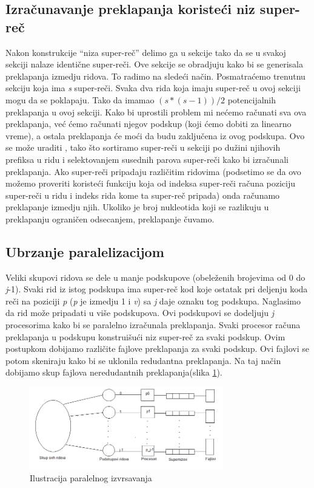 \documentclass[a4paper]{article}
\begin{document}
{\subsection{Izračunavanje preklapanja koristeći niz super-reč}
\label{subsec:ipknsr}
\indent Nakon konstrukcije ``niza super-reč'' delimo ga u sekcije tako da se u svakoj sekciji nalaze identične super-reči. Ove sekcije se obradjuju kako bi se generisala preklapanja izmedju ridova. To radimo na sledeći način. Posmatraćemo trenutnu sekciju koja ima \textit{s} super-reči. Svaka dva rida koja imaju super-reč u ovoj sekciji mogu da se poklapaju. Tako da imamao \((s*(s-1))/2\) potencijalnih preklapanja u ovoj sekciji. Kako bi uprostili problem mi nećemo računati sva ova preklapanja, već ćemo računati njegov podskup (koji ćemo dobiti za linearno vreme), a ostala preklapanja će moći da budu zaključena iz ovog podskupa. Ovo se može uraditi , tako što sortiramo super-reči u sekciji po dužini njihovih prefiksa u ridu i selektovanjem susednih parova super-reči kako bi izračunali preklapanja. Ako super-reči pripadaju različitim ridovima (podsetimo se da ovo možemo proveriti koristeći funkciju koja od indeksa super-reči računa poziciju super-reči u ridu i indeks rida kome ta super-reč pripada) onda računamo preklapanje izmedju njih. Ukoliko je broj nukleotida koji se razlikuju u preklapanju ograničen odsecanjem, preklapanje čuvamo.

\subsection{Ubrzanje paralelizacijom}
\label{subsec:up}
Veliki skupovi ridova se dele u manje podskupove (obeleženih brojevima od 0 do \textit{j}-1). Svaki rid iz istog podskupa ima super-reč kod koje ostatak pri deljenju koda reči na poziciji \textit{p} (\textit{p} je izmedju 1 i \textit{v}) sa \textit{j} daje oznaku tog podskupa. Naglasimo da rid može pripadati u više podskupova. Ovi podskupovi se dodeljuju \textit{j} procesorima kako bi se  paralelno izračunala preklapanja. Svaki procesor računa preklapanja u podskupu konstruišući niz super-reč za svaki podskup. Ovim postupkom dobijamo različite fajlove preklapanja za svaki podskup. Ovi fajlovi se potom skeniraju kako bi se uklonila redudantna preklapanja. Na taj način dobijamo skup  fajlova neredudantnih preklapanja(slika \ref{fig:paralelizacija}). 
\begin{figure}[h!]
\begin{center}
\end{center}
\centering
\includegraphics[width=0.75\textwidth]{paralelizacija}
\caption{Ilustracija paralelnog izvrsavanja}
\label{fig:paralelizacija}
\end{figure}

}
\end{document}
